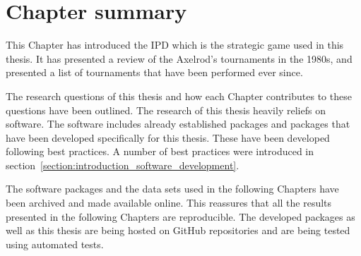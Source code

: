 \section{Chapter summary}

This Chapter has introduced the IPD which is the
strategic game used in this thesis. It has presented a review of the Axelrod's
tournaments in the 1980s, and presented a list of tournaments that have been
performed ever since.

The research questions of this thesis and how each Chapter contributes to these
questions have been outlined. The research of this thesis heavily reliefs on
software. The software includes already established packages and packages that
have been developed specifically for this thesis. These have been developed
following best practices. A number of best practices were introduced in
section~\ref{section:introduction_software_development}.

The software packages and the data sets used in the following Chapters have been
archived and made available online. This reassures that all the results
presented in the following Chapters are reproducible. The developed packages as
well as this thesis are being hosted on GitHub repositories and are being tested
using automated tests.
